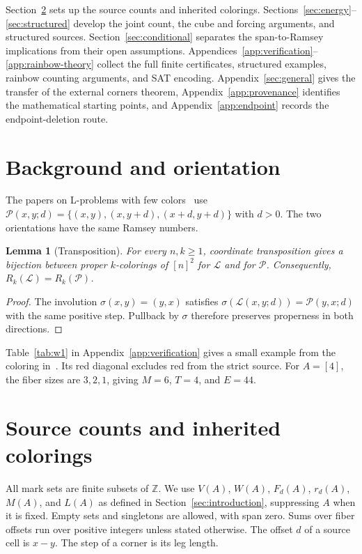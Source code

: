 \documentclass[11pt,a4paper]{article}
\newif\ifshowrevisions
\newenvironment{revision}{\par\begingroup\ifshowrevisions\color{red}\fi}{\par\endgroup}
\newtheorem{lemma}[theorem]{Lemma}
\theoremstyle{definition}
\newcommand{\Lconf}{\mathcal L}
\newcommand{\Pconf}{\mathcal P}
\newcommand{\Z}{\mathbb Z}
\numberwithin{equation}{section}
\begin{document}
\begin{revision}
Section~\ref{sec:formalism} sets up the source counts and inherited colorings. Sections~\ref{sec:energy}--\ref{sec:structured} develop the joint count, the cube and forcing arguments, and structured sources. Section~\ref{sec:conditional} separates the span-to-Ramsey implications from their open assumptions. Appendices~\ref{app:verification}--\ref{app:rainbow-theory} collect the full finite certificates, structured examples, rainbow counting arguments, and SAT encoding. Appendix~\ref{sec:general} gives the transfer of the external corners theorem, Appendix~\ref{app:provenance} identifies the mathematical starting points, and Appendix~\ref{app:endpoint} records the endpoint-deletion route.
\end{revision}
\FloatBarrier

\section{Background and orientation}\label{sec:background}
The papers on L-problems with few colors~\cite{CCFGMS23,MSY25} use
$\Pconf(x,y;d)=\{(x,y),(x,y+d),(x+d,y+d)\}$ with $d>0$.
The two orientations have the same Ramsey numbers.

\begin{lemma}[Transposition]\label{lem:transpose}
For every $n,k\ge1$, coordinate transposition gives a bijection between
proper $k$-colorings of $[n]^2$ for $\Lconf$ and for $\Pconf$.
Consequently, $R_k(\Lconf)=R_k(\Pconf)$.
\end{lemma}
\begin{proof}
The involution $\sigma(x,y)=(y,x)$ satisfies
$\sigma(\Lconf(x,y;d))=\Pconf(y,x;d)$ with the same positive step.
Pullback by $\sigma$ therefore preserves properness in both directions.
\end{proof}

Table~\ref{tab:w1} in Appendix~\ref{app:verification} gives a small example
from the coloring in~\cite[Figure~1]{CCFGMS23}. Its red diagonal excludes red from the
strict source. For $A=[4]$, the fiber sizes are
$3,2,1$, giving $M=6$, $T=4$, and $E=44$.

\section{Source counts and inherited colorings}\label{sec:formalism}
All mark sets are finite subsets of $\Z$. We use
$V(A)$, $W(A)$, $F_d(A)$, $r_d(A)$, $M(A)$, and $L(A)$ as defined in
Section~\ref{sec:introduction}, suppressing $A$ when it is fixed.
Empty sets and singletons are allowed, with span zero.
Sums over fiber offsets run over positive integers unless stated otherwise.
The offset $d$ of a source cell is $x-y$. The step
of a corner is its leg length.
\end{document}
